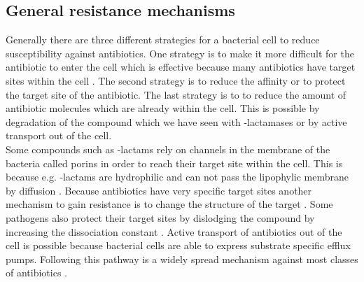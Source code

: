 \subsection{General resistance mechanisms}
Generally there are three different strategies for a bacterial cell to reduce susceptibility against antibiotics. One strategy is to make it more difficult for the antibiotic to enter the cell which is effective because many antibiotics have target sites within the cell \cite{barreteau_cytoplasmic_2008}. The second strategy is to reduce the affinity or to protect the target site of the antibiotic. The last strategy is to  to reduce the amount of antibiotic molecules which are already within the cell. This is possible by degradation of the compound which we have seen with \textbeta-lactamases or by active transport out of the cell.\\
Some compounds such as \textbeta-lactams rely on channels in the membrane of the bacteria called porins in order to reach their target site within the cell. This is because e.g. \textbeta-lactams are hydrophilic and can not pass the lipophylic membrane by diffusion \cite{munita_mechanisms_2016}. Because antibiotics have very specific target sites another mechanism to gain resistance is to change the structure of the target \cite{munita_mechanisms_2016}. Some pathogens also protect their target sites by dislodging the compound by increasing the dissociation constant \cite{connell_ribosomal_2003}.
Active transport of antibiotics out of the cell is possible because bacterial cells are able to express substrate specific efflux pumps. Following this pathway is a widely spread mechanism against most classes of antibiotics \cite{munita_mechanisms_2016}.

